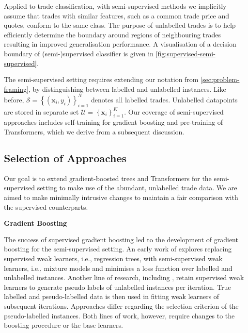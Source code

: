 Applied to trade classification, with semi-supervised methods we implicitly assume that trades with similar features, such as a common trade price and quotes, conform to the same class. The purpose of unlabelled trades is to help efficiently determine the boundary around regions of neighbouring trades resulting in improved generalisation performance. A visualisation of a decision boundary of (semi-)supervised classifier is given in \cref{fig:supervised-semi-supervised}.

The semi-supervised setting requires extending our notation from \cref{sec:problem-framing}, by distinguishing between labelled and unlabelled instances. Like before, $\mathcal{S}=\left\{\left(\mathbf{x}_i, y_i\right)\right\}_{i=1}^N$ denotes all labelled trades. Unlabelled datapoints are stored in separate set $\mathcal{U} = \left\{\mathbf{x}_i\right\}_{i=1}^{K}$. Our coverage of semi-supervised approaches includes self-training for gradient boosting and pre-training of Transformers, which we derive from a subsequent discussion.

\subsection{Selection of Approaches}\label{sec:selection-of-approaches-1}

Our goal is to extend gradient-boosted trees and Transformers for the semi-supervised setting to make use of the abundant, unlabelled trade data. We are aimed to make minimally intrusive changes to maintain a fair comparison with the supervised counterparts.

\textbf{Gradient Boosting}

The success of supervised gradient boosting led to the development of gradient boosting for the semi-supervised setting. An early work of \textcite[][3--4]{dalche-bucSemisupervisedMarginBoost2001} explores replacing supervised weak learners, i.e., regression trees, with semi-supervised weak learners, i.e., mixture models and minimises a loss function over labelled and unlabelled instances. Another line of research, including \textcites[][290--291]{bennettExploitingUnlabeledData2002}[][2003--2004]{mallapragadaSemiBoostBoostingSemiSupervised2009}, retain supervised weak learners to generate pseudo labels of unlabelled instances per iteration. True labelled and pseudo-labelled data is then used in fitting weak learners of subsequent iterations. Approaches differ regarding the selection criterion of the pseudo-labelled instances. Both lines of work, however, require changes to the boosting procedure or the base learners.

